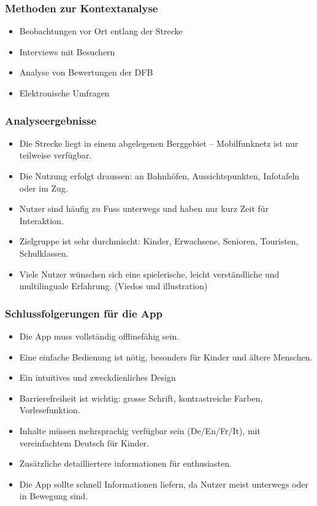 \documentclass[10pt]{article}
\begin{document}
	\subsubsection{Methoden zur Kontextanalyse}
	
	\begin{itemize}
		\item Beobachtungen vor Ort entlang der Strecke
		\item Interviews mit Besuchern
		\item Analyse von Bewertungen der DFB
		\item Elektronische Umfragen
	\end{itemize}
	
	\subsubsection{Analyseergebnisse}
	\begin{itemize}
		\item Die Strecke liegt in einem abgelegenen Berggebiet – Mobilfunknetz ist nur teilweise verfügbar.
		\item Die Nutzung erfolgt draussen: an Bahnhöfen, Aussichtspunkten, Infotafeln oder im Zug.
		\item Nutzer sind häufig zu Fuss unterwegs und haben nur kurz Zeit für Interaktion.
		\item Zielgruppe ist sehr durchmischt: Kinder, Erwachsene, Senioren, Touristen, Schulklassen.
		\item Viele Nutzer wünschen sich eine spielerische, leicht verständliche und multilinguale Erfahrung. (Viedos und illustration)
	\end{itemize}
	
	\subsubsection{Schlussfolgerungen für die App}
	\begin{itemize}
		\item Die App muss vollständig offlinefähig sein.
		\item Eine einfache Bedienung ist nötig, besonders für Kinder und ältere Menschen.
		\item Ein intuitives und zweckdienliches Design
		\item Barrierefreiheit ist wichtig: grosse Schrift, kontrastreiche Farben, Vorlesefunktion.
		\item Inhalte müssen mehrsprachig verfügbar sein (De/En/Fr/It), mit vereinfachtem Deutsch für Kinder.
		\item Zusätzliche detailliertere informationen für enthusiasten.
		\item Die App sollte schnell Informationen liefern, da Nutzer meist unterwegs oder in Bewegung sind.
	\end{itemize}
	\pagebreak
\end{document}
